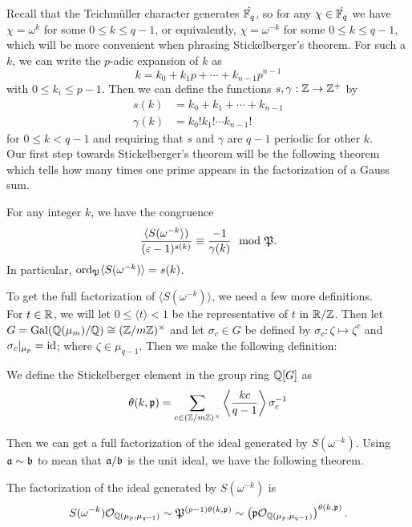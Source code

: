 Recall that the Teichm\"uller character generates $\hat{\mathbb{F}_q}$, so for any $\chi \in \hat{\mathbb{F}_q}$ we have $\chi = \omega^k$ for some $0 \leq k \leq q-1$, or equivalently, $\chi = \omega^{-k}$ for some $0 \leq k \leq q-1$, which will be more convenient when phrasing Stickelberger's theorem.
For such a $k$, we can write the $p$-adic expansion of $k$ as
\[k = k_0 + k_1 p + \cdots + k_{n-1}p^{n-1}\]
with $0 \leq k_i \leq p-1$. Then we can define the functions $s, \gamma : \mathbb{Z} \to \mathbb{Z}^+$ by 
\begin{align*}
s(k) &= k_0 + k_1 + \cdots + k_{n-1} \\
\gamma(k) &= k_0! k_1!  \cdots  k_{n-1}!
\end{align*}
for $0 \leq k < q-1$ and requiring that $s$ and $\gamma$ are $q-1$ periodic for other $k$.
\\

Our first step towards Stickelberger's theorem will be the following theorem which tells how many times one prime appears in the factorization of a Gauss sum.
\begin{theorem}\label{thm:Stickelberger}
For any integer $k$, we have the congruence 
\[\frac{\langle S(\omega^{-k} \rangle)}{(\varepsilon - 1)^{s(k)}} \equiv \frac{-1}{\gamma(k)} \mod {\mathfrak{P}}.\]
In particular, $\textrm{ord}_{\mathfrak{P}} \langle S(\omega^{-k})\rangle = s(k)$.
\end{theorem}
To get the full factorization of $\langle S(\omega^{-k})\rangle $, we need a few more definitions.\\

For $t \in \mathbb{R}$, we will let $0 \leq \langle t \rangle < 1$ be the representative of $t$ in $ \mathbb{R} / \mathbb{Z}$. 
Then let $G = \textrm{Gal}(\mathbb{Q}(\mu_m)/\mathbb{Q}) \cong (\mathbb{Z} / m\mathbb{Z})^\times$ and let $\sigma_c \in G$ be defined by $\sigma_c : \zeta \mapsto \zeta^c$ and $\sigma_c|_{\mu_p}  = \textrm{id}$; where $\zeta \in \mu_{q-1}$.
Then we make the following definition: 
\begin{defn}
We define the Stickelberger element in the group ring $\mathbb{Q}[G]$ as 
\[\theta(k,\mathfrak{p}) = \sum_{c \in (\mathbb{Z}/m\mathbb{Z})^\times} \left \langle \frac{kc}{q-1}\right\rangle \sigma_c^{-1}\]
\end{defn}
Then we can get a full factorization of the ideal generated by $S(\omega^{-k})$. Using $\mathfrak{a} \sim \mathfrak{b}$ to mean that $\mathfrak{a} / \mathfrak{b}$ is the unit ideal, we have the following theorem.
\begin{theorem}
The factorization of the ideal generated by $S(\omega^{-k})$ is \[S(\omega^{-k})\mathcal{O}_{\mathbb{Q}(\mu_{p}, \mu_{q-1})} \sim \mathfrak{P}^{(p-1)\theta(k, \mathfrak{p})} \sim \left( \mathfrak{p}\mathcal{O}_{\mathbb{Q}(\mu_{p}, \mu_{q-1})} \right)^{\theta(k,\mathfrak{p})}.\]
\end{theorem}



